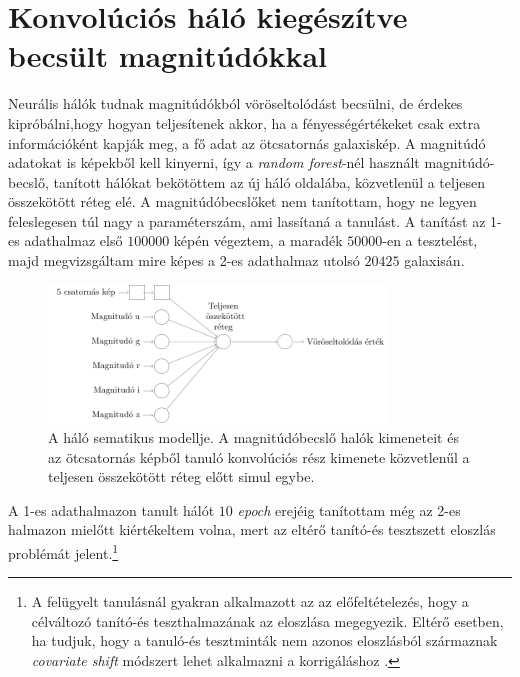 \documentclass[12pt,letterpaper,oneside,openright]{book}
\begin{document}
 \section{Konvolúciós háló kiegészítve becsült magnitúdókkal}
 Neurális hálók tudnak magnitúdókból vöröseltolódást becsülni, de érdekes kipróbálni,hogy hogyan teljesítenek akkor, ha a fényességértékeket csak extra információként kapják meg, a fő adat az ötcsatornás galaxiskép. A magnitúdó adatokat is képekből kell kinyerni, így a \textit{random forest}-nél használt magnitúdó-becslő, tanított hálókat bekötöttem az új háló oldalába, közvetlenül a teljesen összekötött réteg elé. A magnitúdóbecslőket nem tanítottam, hogy ne legyen feleslegesen túl nagy a paraméterszám, ami lassítaná a tanulást. 
 \newline\indent 
 A tanítást az 1-es adathalmaz első $\num{100000}$ képén végeztem, a maradék $\num{50000}$-en a tesztelést, majd megvizsgáltam mire képes a 2-es adathalmaz utolsó $\num{20425}$ galaxisán.
 \begin{figure}[h!]
 \centering
 \includegraphics[width = 0.8\textwidth]{Figures/magnet.pdf}
 \caption{A háló sematikus modellje. A magnitúdóbecslő halók kimeneteit és az ötcsatornás képből tanuló konvolúciós rész kimenete közvetlenűl a teljesen összekötött réteg előtt simul egybe.}
 \label{fig:magnet}
 \end{figure}
A 1-es adathalmazon tanult hálót $10$ \textit{epoch} erejéig tanítottam még az 2-es halmazon mielőtt kiértékeltem volna, mert az eltérő tanító-és tesztszett eloszlás problémát jelent.\footnote{A felügyelt tanulásnál gyakran alkalmazott az az előfeltételezés, hogy a célváltozó tanító-és teszthalmazának az eloszlása megegyezik. Eltérő esetben, ha tudjuk, hogy a tanuló-és tesztminták nem azonos eloszlásból származnak \textit{covariate shift} módszert lehet alkalmazni a korrigáláshoz \cite{covs}.}
\newline\indent
\end{document}
